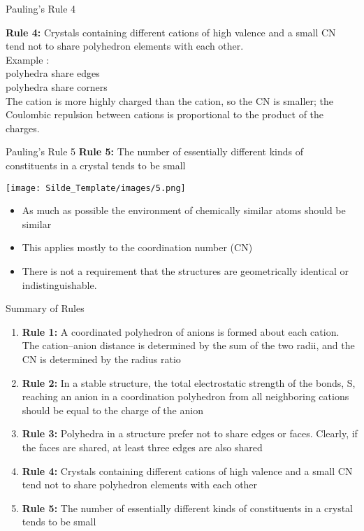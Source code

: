 \documentclass{libs/XJTLU_format}
\begin{document}
 \begin{frame}{Pauling's Rule 4}

    \textbf{Rule 4:} Crystals containing different cations of high valence and a small CN tend not to share polyhedron elements with each other. \\[2em]
    
    \pause
    Example :\\[0.5em]
      polyhedra share edges \\
      polyhedra share corners \\[1em] 
    
    \pause
    \justifying
    The  cation is more highly charged than the  cation, so the CN is smaller; the Coulombic repulsion between cations is proportional to the product of the charges.
    
 \end{frame}
 
\begin{frame}{Pauling's Rule 5}
\textbf{Rule 5:} The number of essentially different kinds of constituents in a crystal tends to be small\\[1em]
\pause

\centering
\texttt{[image: Silde\_Template/images/5.png]}

\pause
\begin{itemize}
    \item As much as possible the environment of chemically similar atoms should be similar \pause
    \item This applies mostly to the coordination number (CN) \pause
    \item There is not a requirement that the structures are geometrically identical or indistinguishable.
\end{itemize}
\end{frame}

\begin{frame}{Summary of Rules}
\begin{enumerate}
    \item \textbf{Rule 1:} A coordinated polyhedron of anions is formed about each cation. The cation–anion distance is determined by the sum of the two radii, and the CN is determined by the radius ratio \pause
    \item \textbf{Rule 2:} In a stable structure, the total electrostatic strength of the bonds, S, reaching an anion in a coordination polyhedron from all neighboring cations should be equal to the charge of the anion \pause
    \item \textbf{Rule 3:} Polyhedra in a structure prefer not to share edges or faces. Clearly, if the faces are shared, at least three edges are also shared \pause
    \item \textbf{Rule 4:} Crystals containing different cations of high valence and a small CN tend not to share polyhedron elements with each other \pause
    \item \textbf{Rule 5:} The number of essentially different kinds of constituents in a crystal tends to be small
\end{enumerate}
    
\end{frame}
\end{document}
